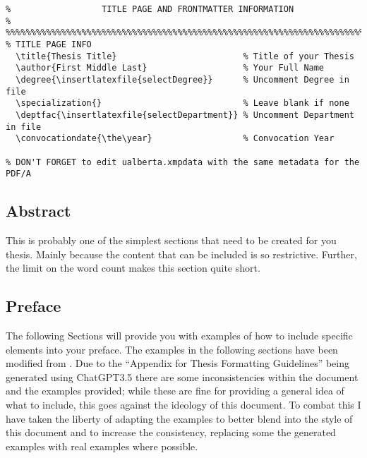 			\begin{lstlisting}[float=ht,caption=Example of How to Set Title Page Info,label=lst:TitlePage,style=LaTeXStyle,basicstyle=\scriptsize\ttfamily,]
%%%%%%%%%%%%%%%%%%%%%%%%%%%%%%%%%%%%%%%%%%%%%%%%%%%%%%%%%%%%%%%%%%%%%%%%%%%%%%%%
%                  TITLE PAGE AND FRONTMATTER INFORMATION                      %
%%%%%%%%%%%%%%%%%%%%%%%%%%%%%%%%%%%%%%%%%%%%%%%%%%%%%%%%%%%%%%%%%%%%%%%%%%%%%%%%
% TITLE PAGE INFO
  \title{Thesis Title}                         % Title of your Thesis
  \author{First Middle Last}                   % Your Full Name
  \degree{\insertlatexfile{selectDegree}}      % Uncomment Degree in file
  \specialization{}                            % Leave blank if none
  \deptfac{\insertlatexfile{selectDepartment}} % Uncomment Department in file
  \convocationdate{\the\year}                  % Convocation Year

% DON'T FORGET to edit ualberta.xmpdata with the same metadata for the PDF/A
			\end{lstlisting}
			

		\subsection{Abstract}\label{abstract}
			This is probably one of the simplest sections that need to be created for you thesis.
			Mainly because the content that can be included is so restrictive.
			Further, the limit on the word count makes this section quite short.


		\subsection{Preface}\label{preface}
			The following Sections will provide you with examples of how to include specific elements into your preface.
			The examples in the following sections have been modified from .
			Due to the ``Appendix for Thesis Formatting Guidelines'' being generated using ChatGPT3.5 there are some inconsistencies within the document and the examples provided; while these are fine for providing a general idea of what to include, this goes against the ideology of this document.
			To combat this I have taken the liberty of adapting the examples to better blend into the style of this document and to increase the consistency, replacing some the generated examples with real examples where possible.
			
